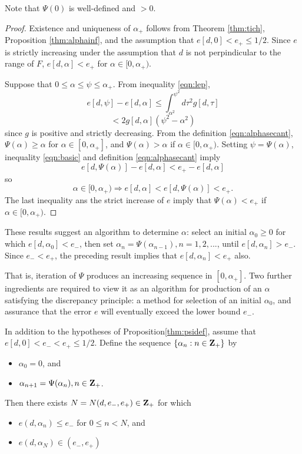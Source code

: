  Note that $\Psi(0)$ is well-defined and $>0$.

\begin{proof} Existence and uniqueness of $\alpha_+$ follows from Theorem \ref{thm:tich}, Proposition \ref{thm:alphainf}, and the assumption that $e[d,0]<e_+\le 1/2$. Since $e$ is strictly increasing under the assumption that $d$ is not perpindicular to the range of $F$, $e[d,\alpha]<e_+$ for $\alpha \in [0,\alpha_+)$. 

Suppose that $0 \le \alpha \le \psi \le \alpha_+$. From inequality \ref{eqn:lep}, 
\[
e[d,\psi]-e[d,\alpha] \le \int^{\psi^2}_{\alpha^2} d\tau^2 g[d,\tau] 
\]
\begin{equation}
\label{eqn:basic}
< 2 g[d,\alpha] (\psi^2-\alpha^2)  
\end{equation}
since $g$ is positive and strictly decreasing. From the definition \ref{eqn:alphasecant}, $\Psi(\alpha) \ge \alpha$ for $\alpha \in [0,\alpha_+]$, and $\Psi(\alpha)>\alpha$ if $\alpha \in [0,\alpha_+)$. Setting $\psi=\Psi(\alpha)$, 
inequality \ref{eqn:basic} and definition \ref{eqn:alphasecant} imply
\[
e[d,\Psi(\alpha)]-e[d,\alpha] < e_{+}-e[d,\alpha]
\]
so
\begin{equation}
\label{eqn:assert}
\alpha \in [0,\alpha_+) \Rightarrow e[d,\alpha] < e[d,\Psi(\alpha)] < e_{+}.
\end{equation}
The last inequality ans the strict increase of $e$ imply that $\Psi(\alpha)<e_+$ if $\alpha \in [0,\alpha_+)$.
\end{proof}

These results suggest an algorithm to determine $\alpha$: select an initial $\alpha_0 \ge 0$ for which $e[d,\alpha_0]<e_-$, then set $\alpha_n=\Psi(\alpha_{n-1}), n=1,2,...$, until $e[d,\alpha_n] > e_-$. Since $e_-<e_+$, the preceding result implies that $e[d,\alpha_n]<e_+$ also. 

That is, iteration of $\Psi$ produces an increasing sequence in $[0,\alpha_+]$. Two further ingredients are required to view it as an algorithm for production of an $\alpha$ satisfying the discrepancy principle:  a method for selection of an initial $\alpha_0$, and assurance that the error $e$ will eventually exceed the lower bound $e_-$. 

\begin{theorem}
  \label{thm:discrepalg} In addition to the hypotheses of Proposition\ref{thm:psidef}, assume that $e[d,0] <e_-<e_+\le 1/2$. Define the sequence $\{\alpha_n: n \in {\bf Z}_+\}$ by
  \begin{itemize}
      \item $\alpha_0=0$, and
      \item $\alpha_{n+1}=\Psi(\alpha_n), n \in {\bf Z}_+$.
  \end{itemize}
  Then there exists $N=N(d,e_-,e_+) \in {\bf Z}_+$ for which 
  \begin{itemize}
      \item $e(d,\alpha_n) \le e_-$ for $0 \le n <N$, and
      \item $e(d,\alpha_N) \in (e_-,e_+)$
  \end{itemize}
\end{theorem}

